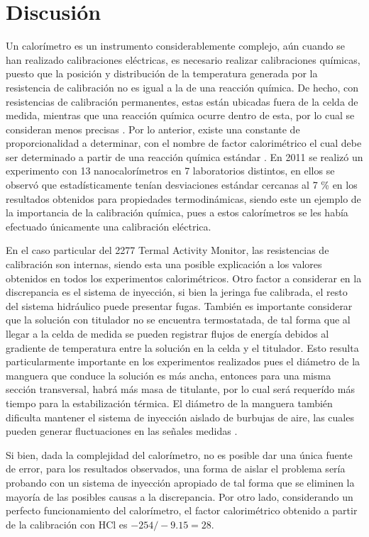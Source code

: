 \newpage

\section{Discusión}
	Un calor\'imetro es un instrumento considerablemente complejo, a\'un cuando se han realizado calibraciones el\'ectricas, es necesario realizar calibraciones qu\'imicas, puesto que la posici\'on y distribuci\'on de la temperatura generada por la resistencia de calibraci\'on no es igual a la de una reacci\'on qu\'imica. De hecho, con resistencias de calibraci\'on permanentes, estas est\'an ubicadas fuera de la celda de medida, mientras que una reacci\'on qu\'imica ocurre dentro de esta, por lo cual se consideran menos precisas \cite{briggner1991test}. Por lo anterior, existe una constante de proporcionalidad a determinar, con el nombre de factor calorim\'etrico el cual debe ser determinado a partir de una reacci\'on qu\'imica est\'andar \cite{demarse2011calibration}. En 2011 se realiz\'o un experimento con 13 nanocalor\'imetros en 7 laboratorios distintos, en ellos se observ\'o que estad\'isticamente ten\'ian desviaciones est\'andar cercanas al 7 \% en los resultados obtenidos para propiedades termodin\'amicas, siendo este un ejemplo de la importancia de la calibraci\'on qu\'imica, pues a estos calor\'imetros se les hab\'ia efectuado \'unicamente una calibraci\'on el\'ectrica.
	
	En el caso particular del 2277 Termal Activity Monitor, las resistencias de calibraci\'on son internas, siendo esta una posible explicaci\'on a los valores obtenidos en todos los experimentos calorim\'etricos. Otro factor a considerar en la discrepancia es el sistema de inyecci\'on, si bien la jeringa fue calibrada, el resto del sistema hidr\'aulico puede presentar fugas. Tambi\'en es importante considerar que la soluci\'on con titulador no se encuentra termostatada, de tal forma que al llegar a la celda de medida se pueden registrar flujos de energ\'ia debidos al gradiente de temperatura entre la soluci\'on en la celda y el titulador. Esto resulta particularmente importante en los experimentos realizados pues el di\'ametro de la manguera que conduce la soluci\'on es m\'as ancha, entonces para una misma secci\'on transversal, habr\'a m\'as masa de titulante, por lo cual ser\'a requer\'ido m\'as tiempo para la estabilizaci\'on t\'ermica. El di\'ametro de la manguera tambi\'en dificulta mantener el sistema de inyecci\'on aislado de burbujas de aire, las cuales pueden generar fluctuaciones en las se\~nales medidas \cite{duff2011isothermal}.
	
	Si bien, dada la complejidad del calor\'imetro, no es posible dar una \'unica fuente de error, para los resultados observados, una forma de aislar el problema ser\'ia probando con un sistema de inyecci\'on apropiado de tal forma que se eliminen la mayor\'ia de las posibles causas a la discrepancia. Por otro lado, considerando un perfecto funcionamiento del calor\'imetro, el factor calorim\'etrico obtenido a partir de la calibraci\'on con HCl es $-254/-9.15 = 28$.